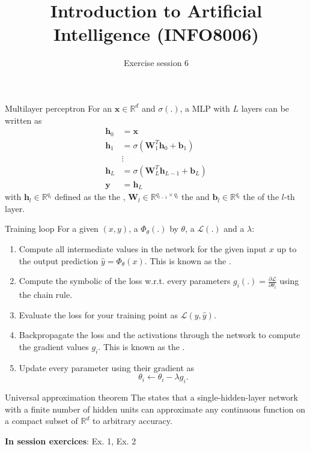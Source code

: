 \documentclass[11pt, a4paper]{article}
\title{Introduction to Artificial Intelligence (INFO8006)}
\subtitle{Exercise session 6}
\begin{document}
\maketitle

\begin{thbox}{Multilayer perceptron}
    For an  $\mathbf{x} \in \mathbb{R}^d$ and   $\sigma(.)$, a MLP with $L$ layers can be written as 
    \begin{align*}
        \mathbf{h}_0 &= \mathbf{x}\\
        \mathbf{h}_1 &= \sigma(\mathbf{W}_1^T\mathbf{h}_0 + \mathbf{b}_1)\\
        &\vdots\\
        \mathbf{h}_L &= \sigma(\mathbf{W}_L^T\mathbf{h}_{L-1} + \mathbf{b}_L)\\
        \mathbf{y} &= \mathbf{h}_L
    \end{align*}
    with $\mathbf{h}_l \in \mathbb{R}^{q_l}$ defined as the the , $\mathbf{W}_l \in \mathbb{R}^{q_{l-1} \times q_l}$ the  and $\mathbf{b}_l \in \mathbb{R}^{q_l}$ the  of the $l$-th layer.
\end{thbox}
\begin{thbox}{Training loop}
    For a given  $(x, y)$, a  $\Phi_\theta(.)$  by $\theta$, a  $\mathcal{L}(.)$ and a  $\lambda$:
    \begin{enumerate}
        \item Compute all intermediate values in the network for the given input $x$ up to the output prediction $\hat{y} = \Phi_\theta(x)$. This is known as the .
        \item Compute the symbolic  of the loss w.r.t. every parameters $g_i(.) = \frac{\partial \mathcal{L}}{\partial \theta_i}$ using the chain rule.
        \item Evaluate the loss for your training point as $\mathcal{L}(y,\hat{y})$.
        \item Backpropagate the loss and the activations through the network to compute the gradient values $g_i$. This is known as the .
        \item Update every parameter using their gradient as 
        $$
        \theta_i \leftarrow \theta_i - \lambda g_i.
        $$
    \end{enumerate}
\end{thbox}
\begin{thbox}{Universal approximation theorem}
    The  states that a single-hidden-layer network with a finite number of hidden units can approximate any continuous function on a compact subset of $\mathbb{R}^d$ to arbitrary accuracy.
\end{thbox}
\textbf{In session exercices}: Ex. 1, Ex. 2
\newpage
\end{document}
